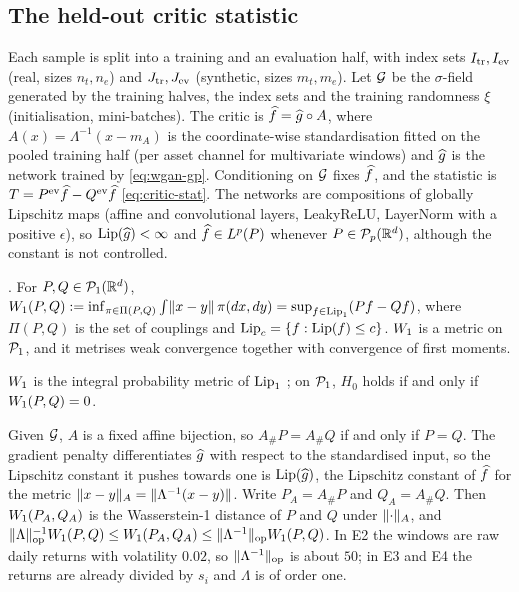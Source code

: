 \subsection{The held-out critic statistic}\label{sec:theory-critic}

Each sample is split into a training and an evaluation half, with index sets $I_{\mathrm{tr}},I_{\mathrm{ev}}$ (real,
sizes $n_t,n_e$) and $J_{\mathrm{tr}},J_{\mathrm{ev}}$ (synthetic, sizes $m_t,m_e$). Let $\mathcal{G}$ be the $\sigma$-field
generated by the training halves, the index sets and the training randomness $\xi$
(initialisation, mini-batches). The critic is $\widehat{f}=\widehat{g}\circ A$, where
$A(x)=\Lambda^{-1}(x-m_A)$ is the coordinate-wise standardisation fitted on the pooled training
half (per asset channel for multivariate windows) and $\widehat{g}$ is the network trained by
\eqref{eq:wgan-gp}. Conditioning on $\mathcal{G}$ fixes $\widehat{f}$, and the statistic is
$T=P^{\mathrm{ev}}\widehat{f}-Q^{\mathrm{ev}}\widehat{f}$ \eqref{eq:critic-stat}. The networks are compositions of globally
Lipschitz maps (affine and convolutional layers, LeakyReLU, LayerNorm with a positive
$\epsilon$), so $\operatorname{Lip}(\widehat{g})<\infty$ and $\widehat{f}\in L^p(P)$ whenever $P\in\mathcal{P}_{p}(\mathbb{R}^d)$, although
the constant is not controlled.

\begin{fact}\label{fact:kr-duality}
\citep[Ch.~5--6]{villani2009optimal}. For $P,Q\in\mathcal{P}_{1}(\mathbb{R}^d)$,
$W_{1}(P,Q):=\inf_{\pi\in\Pi(P,Q)}\int\lVert x-y\rVert\,\pi(dx,dy)=\sup_{f\in\operatorname{Lip}_1}(Pf-Qf)$, where
$\Pi(P,Q)$ is the set of couplings and $\operatorname{Lip}_c=\{f:\operatorname{Lip}(f)\le c\}$. $W_{1}$ is a metric on
$\mathcal{P}_{1}$, and it metrises weak convergence together with convergence of first moments.
\end{fact}

$W_{1}$ is the integral probability metric of $\operatorname{Lip}_1$ \citep{muller1997integral}; on $\mathcal{P}_{1}$,
$H_0$ holds if and only if $W_{1}(P,Q)=0$.

\begin{remark}\label{rem:representation}
Given $\mathcal{G}$, $A$ is a fixed affine bijection, so $A_\#P=A_\#Q$ if and only if $P=Q$. The
gradient penalty differentiates $\widehat{g}$ with respect to the standardised input, so the Lipschitz
constant it pushes towards one is $\operatorname{Lip}(\widehat{g})$, the Lipschitz constant of $\widehat{f}$ for the metric
$\lVert x-y\rVert_A=\lVert\Lambda^{-1}(x-y)\rVert$. Write $P_A=A_\#P$ and $Q_A=A_\#Q$. Then $W_{1}(P_A,Q_A)$ is
the Wasserstein-1 distance of $P$ and $Q$ under $\lVert\cdot\rVert_A$, and
$\lVert\Lambda\rVert_{\mathrm{op}}^{-1}W_{1}(P,Q)\le W_{1}(P_A,Q_A)\le\lVert\Lambda^{-1}\rVert_{\mathrm{op}}W_{1}(P,Q)$.
In E2 the windows are raw daily returns with volatility $0.02$, so $\lVert\Lambda^{-1}\rVert_{\mathrm{op}}$
is about $50$; in E3 and E4 the returns are already divided by $s_i$ and $\Lambda$ is of order one.
\end{remark}

